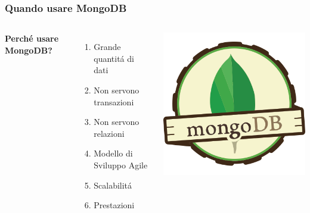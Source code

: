 \documentclass{beamer}
\begin{document}
\begin{frame}
\frametitle{Quando usare MongoDB}
\begin{columns}[c] %

\textbf{Perch\'e usare MongoDB?}
\begin{enumerate}
\item Grande quantit\'a di dati
\item Non servono transazioni
\item Non servono relazioni
\item Modello di Sviluppo Agile
\item Scalabilit\'a
\item Prestazioni
\end{enumerate}

\includegraphics[width=1.2\linewidth]{mongodb.png}

\end{columns}
\end{frame}


\end{document}
